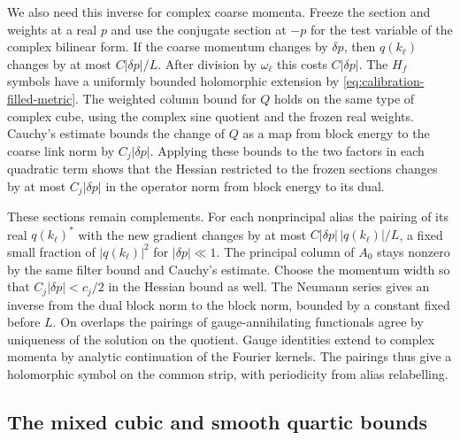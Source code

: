 \documentclass[11pt,reqno]{amsart}
\numberwithin{equation}{section}
\theoremstyle{definition}
\theoremstyle{remark}
\begin{document}
We also need this inverse for complex coarse momenta.
Freeze the section and weights at a real \(p\) and use the
conjugate section at \(-p\) for the test variable of the
complex bilinear form. If the coarse momentum changes by
\(\delta p\), then \(q(k_\ell)\) changes by at most
\(C|\delta p|/L\). After division by \(\omega_\ell\) this
costs \(C|\delta p|\). The \(H_f\) symbols have a uniformly
bounded holomorphic extension by \eqref{eq:calibration-filled-metric}.
The weighted column bound for \(Q\) holds on the same type
of complex cube, using the complex sine quotient and the
frozen real weights. Cauchy's estimate bounds the change of
\(Q\) as a map from block energy to the coarse link norm by
\(C_j|\delta p|\). Applying these bounds to the two factors
in each quadratic term shows that the Hessian restricted to
the frozen sections changes by at most \(C_j|\delta p|\) in
the operator norm from block energy to its dual.

These sections remain complements. For each nonprincipal alias
the pairing of its real \(q(k_\ell)^*\) with the new gradient
changes by at most \(C|\delta p|\,|q(k_\ell)|/L\), a fixed
small fraction of \(|q(k_\ell)|^2\) for \(|\delta p|\ll1\).
The principal column of \(A_0\) stays nonzero by the same filter
bound and Cauchy's estimate. Choose the momentum width so that
\(C_j|\delta p|<c_j/2\) in the Hessian bound as well. The
Neumann series gives an inverse from the dual block norm to
the block norm, bounded by a constant fixed before \(L\).
On overlaps the pairings of gauge-annihilating functionals agree
by uniqueness of the solution on the quotient. Gauge identities
extend to complex momenta by analytic continuation of the
Fourier kernels. The pairings thus give a holomorphic symbol
on the common strip, with periodicity from alias relabelling.


\subsection{The mixed cubic and smooth quartic bounds}
\end{document}
